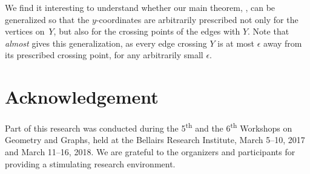 \documentclass{patmorin}
\begin{document}
We find it interesting to understand whether our main theorem,
, can be generalized so that the $y$-coordinates are arbitrarily prescribed not only for the vertices on~$Y$, but also for the crossing points of the edges with $Y$. Note that  {\em almost} gives this generalization, as every edge crossing $Y$ is at most $\epsilon$ away from its prescribed crossing point, for any arbitrarily small $\epsilon$. 

\section*{Acknowledgement}

Part of this research was conducted during the 5\textsuperscript{th} and the 6\textsuperscript{th} Workshops on Geometry and Graphs, held at the Bellairs Research Institute, March 5--10, 2017 and March 11--16, 2018.  We are grateful to the organizers and participants for providing a stimulating research environment.
%



\end{document}
